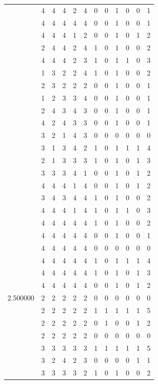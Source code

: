 \documentclass[]{book}
\theoremstyle{definition}
\theoremstyle{definition}
\theoremstyle{definition}
\theoremstyle{remark}
\begin{document}
\begin{table}
{\begin{tabular}[t]{rrrrrrrrrrrr}
 & 4 & 4 & 4 & 2 & 4 & 0 & 0 & 1 & 0 & 0 & 1\\
 & 4 & 4 & 4 & 4 & 4 & 0 & 0 & 1 & 0 & 0 & 1\\
 & 4 & 4 & 4 & 1 & 2 & 0 & 0 & 1 & 0 & 1 & 2\\
 & 2 & 4 & 4 & 2 & 4 & 1 & 0 & 1 & 0 & 0 & 2\\
 & 4 & 4 & 4 & 2 & 3 & 1 & 0 & 1 & 1 & 0 & 3\\
 & 1 & 3 & 2 & 2 & 4 & 1 & 0 & 1 & 0 & 0 & 2\\
 & 2 & 3 & 2 & 2 & 2 & 0 & 0 & 1 & 0 & 0 & 1\\
 & 1 & 2 & 3 & 3 & 4 & 0 & 0 & 1 & 0 & 0 & 1\\
 & 2 & 4 & 3 & 4 & 3 & 0 & 0 & 1 & 0 & 0 & 1\\
 & 4 & 2 & 4 & 3 & 3 & 0 & 0 & 1 & 0 & 0 & 1\\
 & 3 & 2 & 1 & 4 & 3 & 0 & 0 & 0 & 0 & 0 & 0\\
 & 3 & 1 & 3 & 4 & 2 & 1 & 0 & 1 & 1 & 1 & 4\\
 & 2 & 1 & 3 & 3 & 3 & 1 & 0 & 1 & 0 & 1 & 3\\
 & 3 & 3 & 3 & 4 & 1 & 0 & 0 & 1 & 0 & 1 & 2\\
 & 4 & 4 & 4 & 1 & 4 & 0 & 0 & 1 & 0 & 1 & 2\\
 & 3 & 4 & 3 & 4 & 4 & 1 & 0 & 1 & 0 & 0 & 2\\
 & 4 & 4 & 4 & 1 & 4 & 1 & 0 & 1 & 1 & 0 & 3\\
 & 4 & 4 & 4 & 4 & 4 & 1 & 0 & 1 & 0 & 0 & 2\\
 & 4 & 4 & 4 & 4 & 4 & 0 & 0 & 1 & 0 & 0 & 1\\
 & 4 & 4 & 4 & 4 & 4 & 0 & 0 & 0 & 0 & 0 & 0\\
 & 4 & 4 & 4 & 4 & 4 & 1 & 0 & 1 & 1 & 1 & 4\\
 & 4 & 4 & 4 & 4 & 4 & 1 & 0 & 1 & 0 & 1 & 3\\
 & 4 & 4 & 4 & 4 & 4 & 0 & 0 & 1 & 0 & 1 & 2\\
2.500000 & 2 & 2 & 2 & 2 & 2 & 0 & 0 & 0 & 0 & 0 & 0\\
 & 2 & 2 & 2 & 2 & 2 & 1 & 1 & 1 & 1 & 1 & 5\\
 & 2 & 2 & 2 & 2 & 2 & 0 & 1 & 0 & 0 & 1 & 2\\
 & 2 & 2 & 2 & 2 & 2 & 0 & 0 & 0 & 0 & 0 & 0\\
 & 3 & 3 & 3 & 3 & 3 & 1 & 1 & 1 & 1 & 1 & 5\\
 & 3 & 2 & 4 & 2 & 3 & 0 & 0 & 0 & 0 & 1 & 1\\
 & 3 & 3 & 3 & 3 & 2 & 1 & 0 & 1 & 0 & 0 & 2\\

\end{tabular}}
\end{table}
\end{document}
